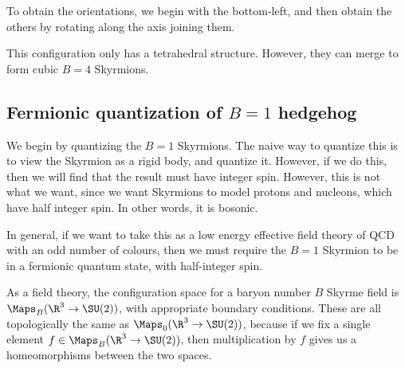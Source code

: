 \documentclass[a4paper]{article}
\begin{document}
\begin{center}
\end{center}
To obtain the orientations, we begin with the bottom-left, and then obtain the others by rotating along the axis joining them.

This configuration only has a tetrahedral structure. However, they can merge to form cubic $B = 4$ Skyrmions.

\subsection{Fermionic quantization of \texorpdfstring{$B = 1$}{B = 1} hedgehog}
We begin by quantizing the $B = 1$ Skyrmions. The naive way to quantize this is to view the Skyrmion as a rigid body, and quantize it. However, if we do this, then we will find that the result must have integer spin. However, this is not what we want, since we want Skyrmions to model protons and nucleons, which have half integer spin. In other words, it is bosonic.

In general, if we want to take this as a low energy effective field theory of QCD with an odd number of colours, then we must require the $B = 1$ Skyrmion to be in a fermionic quantum state, with half-integer spin.

As a field theory, the configuration space for a baryon number $B$ Skyrme field is $\Maps_B(\R^3 \to \SU(2))$, with appropriate boundary conditions. These are all topologically the same as $\Maps_0(\R^3 \to \SU(2))$, because if we fix a single element $f \in \Maps_B(\R^3 \to \SU(2))$, then multiplication by $f$ gives us a homeomorphisms between the two spaces.
\end{document}
